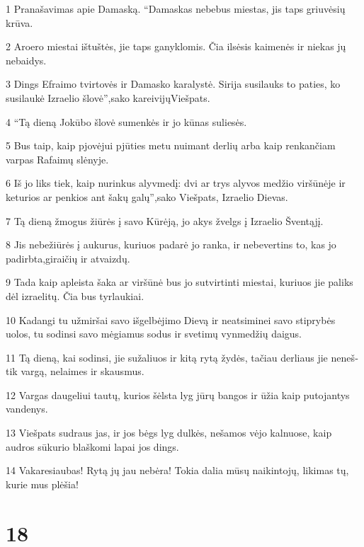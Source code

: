 \par 1 Pranašavimas apie Damaską. “Damaskas nebebus miestas, jis taps griuvėsių krūva. 
\par 2 Aroero miestai ištuštės, jie taps ganyklomis. Čia ilsėsis kaimenės ir niekas jų nebaidys. 
\par 3 Dings Efraimo tvirtovės ir Damasko karalystė. Sirija susilauks to paties, ko susilaukė Izraelio šlovė”,­sako kareivijųViešpats. 
\par 4 “Tą dieną Jokūbo šlovė sumenkės ir jo kūnas suliesės. 
\par 5 Bus taip, kaip pjovėjui pjūties metu nuimant derlių arba kaip renkančiam varpas Rafaimų slėnyje. 
\par 6 Iš jo liks tiek, kaip nurinkus alyvmedį: dvi ar trys alyvos medžio viršūnėje ir keturios ar penkios ant šakų galų”,­sako Viešpats, Izraelio Dievas. 
\par 7 Tą dieną žmogus žiūrės į savo Kūrėją, jo akys žvelgs į Izraelio Šventąjį. 
\par 8 Jis nebežiūrės į aukurus, kuriuos padarė jo ranka, ir nebevertins to, kas jo padirbta,­giraičių ir atvaizdų. 
\par 9 Tada kaip apleista šaka ar viršūnė bus jo sutvirtinti miestai, kuriuos jie paliks dėl izraelitų. Čia bus tyrlaukiai. 
\par 10 Kadangi tu užmiršai savo išgelbėjimo Dievą ir neatsiminei savo stiprybės uolos, tu sodinsi savo mėgiamus sodus ir svetimų vynmedžių daigus. 
\par 11 Tą dieną, kai sodinsi, jie sužaliuos ir kitą rytą žydės, tačiau derliaus jie neneš­tik vargą, nelaimes ir skausmus. 
\par 12 Vargas daugeliui tautų, kurios šėlsta lyg jūrų bangos ir ūžia kaip putojantys vandenys. 
\par 13 Viešpats sudraus jas, ir jos bėgs lyg dulkės, nešamos vėjo kalnuose, kaip audros sūkurio blaškomi lapai jos dings. 
\par 14 Vakare­siaubas! Rytą jų jau nebėra! Tokia dalia mūsų naikintojų, likimas tų, kurie mus plėšia!



\chapter{18}


